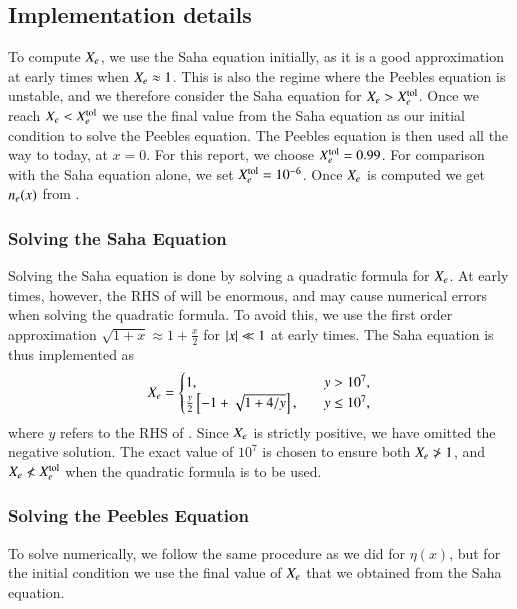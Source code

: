
\subsection{Implementation details}\label{ssec:M2:implementations} 
To compute $X_e$, we use the Saha equation initially, as it is a good approximation at early times when $X_e \approx 1$. This is also the regime where the Peebles equation is unstable, and we therefore consider the Saha equation for $X_e>X_e^\mathrm{tol}$. Once we reach $X_e<X_e^\mathrm{tol}$ we use the final value from the Saha equation as our initial condition to solve the Peebles equation. The Peebles equation is then used all the way to today, at $x=0$. For this report, we choose $X_e^\mathrm{tol}=0.99$. For comparison with the Saha equation alone, we set $X_e^\mathrm{tol}=10^{-6}$. Once $X_e$ is computed we get $n_e(x)$ from . 

\subsubsection{Solving the Saha Equation}\label{sssec:M2:implementations:solving_saha}
Solving the Saha equation is done by solving a quadratic formula for $X_e$. At early times, however, the RHS of  will be enormous, and may cause numerical errors when solving the quadratic formula. To avoid this, we use the first order approximation $\sqrt{1+x}\approx 1 + \frac{x}{2}$ for $\abs{x}\ll1$ at early times. The Saha equation is thus implemented as   
\begin{equation}
    X_e = \begin{cases}
        1, \quad & y>10^7, \\
        \frac{y}{2}\left[ -1 + \sqrt{1 + 4/y} \right],\quad & y\leq 10^7,
    \end{cases}
\end{equation}  
where $y$ refers to the RHS of . Since $X_e$ is strictly positive, we have omitted the negative solution. The exact value of $10^7$ is chosen to ensure both $X_e \ngtr 1$, and $X_e\nless X_e^\mathrm{tol}$ when the quadratic formula is to be used.

\subsubsection{Solving the Peebles Equation}\label{sssec:M2:implementations:solving_peebles}
To solve  numerically, we follow the same procedure as we did for $\eta(x)$, but for the initial condition we use the final value of $X_e$ that we obtained from the Saha equation. 

